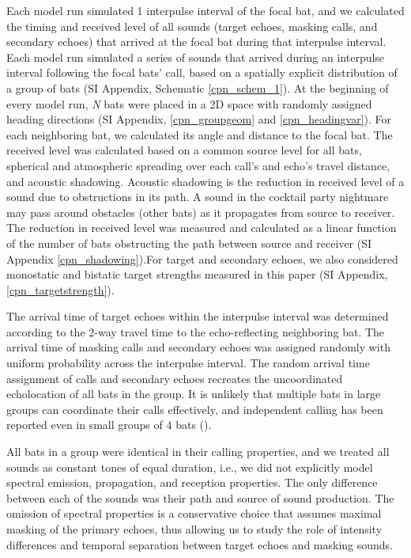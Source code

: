 \documentclass[
]{book}
\begin{document}
Each model run simulated 1 interpulse interval of the focal bat, and we calculated the timing and received level of all sounds (target echoes, masking calls, and secondary echoes) that arrived at the focal bat during that interpulse interval. Each model run simulated a series of sounds that arrived during an interpulse interval following the focal bats' call, based on a spatially explicit distribution of a group of bats (SI Appendix, Schematic \ref{cpn_schem_1}). At the beginning of every model run, \emph{N} bats were placed in a 2D space with randomly assigned heading directions (SI Appendix, \ref{cpn_groupgeom} and \ref{cpn_headingvar}). For each neighboring bat, we calculated its angle and distance to the focal bat. The received level was calculated based on a common source level for all bats, spherical and atmospheric spreading over each call's and echo's travel distance, and acoustic shadowing. Acoustic shadowing is the reduction in received level of a sound due to obstructions in its path. A sound in the cocktail party nightmare may pass around obstacles (other bats) as it propagates from source to receiver. The reduction in received level was measured and calculated as a linear function of the number of bats obstructing the path between source and receiver (SI Appendix \ref{cpn_shadowing}).For target and secondary echoes, we also considered monostatic and bistatic target strengths measured in this paper (SI Appendix, \ref{cpn_targetstrength}).

The arrival time of target echoes within the interpulse interval was determined according to the 2-way travel time to the echo-reflecting neighboring bat. The arrival time of masking calls and secondary echoes was assigned randomly with uniform probability across the interpulse interval. The random arrival time assignment of calls and secondary echoes recreates the uncoordinated echolocation of all bats in the group. It is unlikely that multiple bats in large groups can coordinate their calls effectively, and independent calling has been reported even in small groups of 4 bats (\citet{hase2018a}).

All bats in a group were identical in their calling properties, and we treated all sounds as constant tones of equal duration, i.e., we did not explicitly model spectral emission, propagation, and reception properties. The only difference between each of the sounds was their path and source of sound production. The omission of spectral properties is a conservative choice that assumes maximal masking of the primary echoes, thus allowing us to study the role of intensity differences and temporal separation between target echoes and masking sounds.
\end{document}
